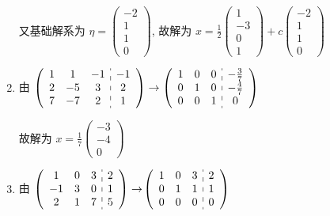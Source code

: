\begin{enumerate}
                   又基础解系为 \( \eta = \begin{pmatrix}
                       -2 \\
                       1  \\
                       1  \\
                       0
                   \end{pmatrix} \), 故解为 \( x = \frac{1}{2}\begin{pmatrix}
                       1  \\
                       -3 \\
                       0  \\
                       1
                   \end{pmatrix} + c\begin{pmatrix}
                       -2 \\
                       1  \\
                       1  \\
                       0
                   \end{pmatrix} \)
             \item %
                   由 \( \left(\begin{array}{ccc:c}
                           1 & 1  & -1 & -1 \\
                           2 & -5 & 3  & 2  \\
                           7 & -7 & 2  & 1
                       \end{array}\right)
                   \to
                   \left(\begin{array}{ccc:c}
                           1 & 0 & 0 & -\frac{3}{7} \\
                           0 & 1 & 0 & -\frac{4}{7} \\
                           0 & 0 & 1 & 0
                       \end{array}\right) \)

                   故解为 \( x = \frac{1}{7}\begin{pmatrix}
                       -3 \\
                       -4 \\
                       0
                   \end{pmatrix} \)
             \item %
                   由 \( \left(\begin{array}{ccc:c}
                           1  & 0 & 3 & 2 \\
                           -1 & 3 & 0 & 1 \\
                           2  & 1 & 7 & 5
                       \end{array}\right)
                   \to \)\(\left(\begin{array}{ccc:c}
                           1 & 0 & 3 & 2 \\
                           0 & 1 & 1 & 1 \\
                           0 & 0 & 0 & 0
                       \end{array}\right) \)


\end{enumerate}
